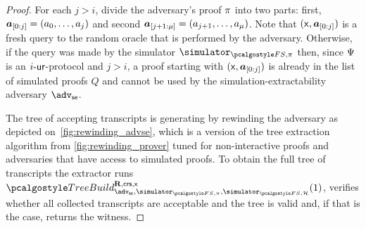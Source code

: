 \documentclass[runningheads,11pt]{llncs}
\let\spvec\vec
\let\vec\accentvec
\let\vec\spvec
\def\vec#1{\mathchoice{\mbox{\boldmath$\displaystyle#1$}}
	{\mbox{\boldmath$\textstyle#1$}}
	{\mbox{\boldmath$\scriptstyle#1$}}
	{\mbox{\boldmath$\scriptscriptstyle#1$}}}
\theoremstyle{definition}
\begin{document}
\begin{proof}
	For each $j > i$, divide the adversary's proof $\pi$ into two parts:
	first, $\vec{a}_{[0:j]} = (a_0, \ldots, a_j)$ and second $\vec{a}_{{[j + 1:\mu]}} = (a_{j + 1}, \ldots, a_\mu)$.
	Note that $(\inp, \vec{a}_{[0:j]})$ is a fresh query to the random oracle that is performed by the adversary.
	Otherwise, if the query was made by the simulator $\simulator_{\fs, \zkproof}$ then, since $\mathrm{\Psi}$ is an ${i\text{-}\mathsf{ur}}$-protocol and $j > i$, a proof starting with $(\inp, \vec{a}_{[0:j]})$ is already in the list of simulated proofs $Q$ and cannot be used by the simulation-extractability adversary $\adv_\se$.

	The tree of accepting transcripts is generating by rewinding the adversary as depicted on~\cref{fig:rewinding_advse}, which is a version of the tree extraction algorithm from \cref{fig:rewinding_prover} tuned for non-interactive proofs and adversaries that have access to simulated proofs.
	To obtain the full tree of transcripts the extractor runs $\treebuild_{\adv_\se, \simulator_{\fs, \zkproof}, \simulator_{\fs, \ro}}^{\REL, \crs, \inp}(1)$, verifies whether all collected transcripts are acceptable and the tree is valid and, if that is the case, returns the witness.
	

\end{proof}
\end{document}
